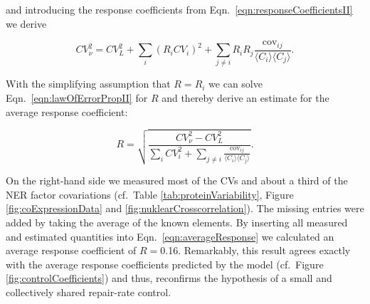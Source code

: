 and introducing the response coefficients from Eqn.\ \ref{eqn:responseCoefficientsII} we derive

\begin{equation}
	CV_{\nu}^2 = CV_{L}^2 + \sum_{i}(R_iCV_i)^2 + \sum_{j\neq i} R_iR_j \frac{\textrm{cov}_{ij}}{\langle C_i \rangle\langle C_j\rangle}.
	\label{eqn:lawOfErrorPropII}
\end{equation}

With the simplifying assumption that $R = R_i$ we can solve Eqn.\ \ref{eqn:lawOfErrorPropII} for $R$ and thereby derive an estimate for the average response coefficient:

\begin{equation}
	R = \sqrt{	\frac{CV_{\nu}^2 - CV_L^2}{\sum_{i} CV_i^2 + \sum_{j\neq i} \frac{\textrm{cov}_{ij}}{\langle C_i \rangle\langle C_j\rangle}}}.
	\label{eqn:averageResponse}
\end{equation} 


On the right-hand side we measured most of the CVs and about a third of the NER factor covariations (cf.\ Table \ref{tab:proteinVariability}, Figure \ref{fig:coExpressionData} and \ref{fig:nuklearCrosscorrelation}). The missing entries were added by taking the average of the known elements. By inserting all measured and estimated quantities into Eqn.\ \ref{eqn:averageResponse} we calculated an average response coefficient of $R =$0.16. Remarkably, this result agrees exactly with the average response coefficients predicted by the model (cf.\ Figure \ref{fig:controlCoefficients}) and thus, reconfirms the hypothesis of a small and collectively shared repair-rate control.     





